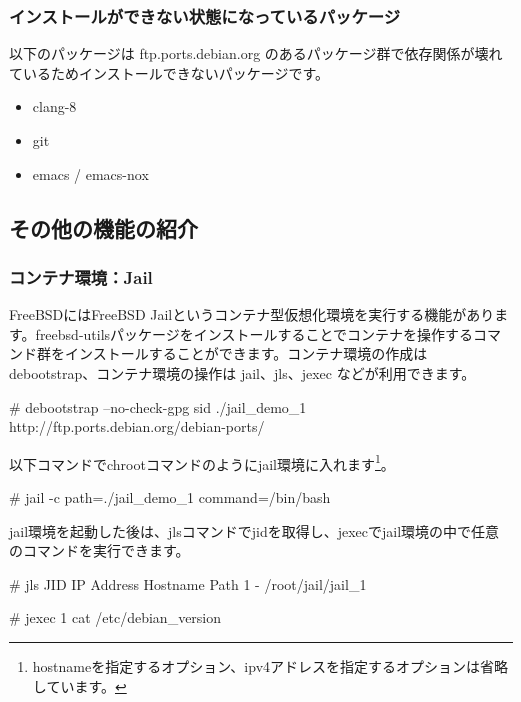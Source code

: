 \documentclass[mingoth,a4paper]{jsarticle}
\begin{document}
\subsubsection{インストールができない状態になっているパッケージ}

以下のパッケージは ftp.ports.debian.org のあるパッケージ群で依存関係が壊れているためインストールできないパッケージです。

\begin{itemize}
\item clang-8
\item git
\item emacs / emacs-nox
\end{itemize}


\subsection{その他の機能の紹介}

\subsubsection{コンテナ環境：Jail}

FreeBSDにはFreeBSD Jailというコンテナ型仮想化環境を実行する機能があります。freebsd-utilsパッケージをインストールすることでコンテナを操作するコマンド群をインストールすることができます。コンテナ環境の作成は debootstrap、コンテナ環境の操作は jail、jls、jexec などが利用できます。

\begin{commandline}
# debootstrap --no-check-gpg sid ./jail_demo_1 http://ftp.ports.debian.org/debian-ports/
\end{commandline}

以下コマンドでchrootコマンドのようにjail環境に入れます\footnote{hostnameを指定するオプション、ipv4アドレスを指定するオプションは省略しています。}。

\begin{commandline}
# jail -c path=./jail_demo_1 command=/bin/bash
\end{commandline}

jail環境を起動した後は、jlsコマンドでjidを取得し、jexecでjail環境の中で任意のコマンドを実行できます。

\begin{commandline}
# jls
JID  IP Address      Hostname                      Path
  1  -                                             /root/jail/jail_1

# jexec 1 cat /etc/debian_version
\end{commandline}
\end{document}
